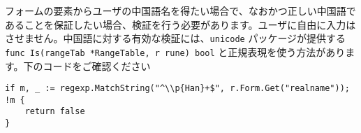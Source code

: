 フォームの要素からユーザの中国語名を得たい場合で、なおかつ正しい中国語であることを保証したい場合、検証を行う必要があります。ユーザに自由に入力はさせません。中国語に対する有効な検証には、\texttt{unicode} パッケージが提供する \texttt{func Is(rangeTab *RangeTable, r rune) bool} と正規表現を使う方法があります。下のコードをご確認ください

\begin{lstlisting}[numbers=none]
if m, _ := regexp.MatchString("^\\p{Han}+$", r.Form.Get("realname")); !m {
    return false
}
\end{lstlisting}
